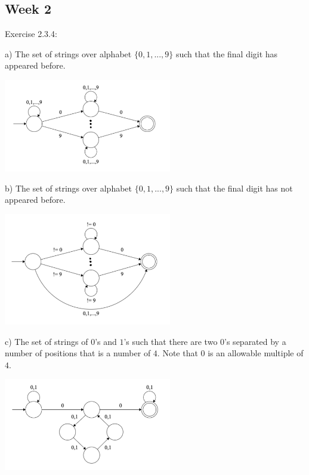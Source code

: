 \documentclass{article}
\theoremstyle{theorem}
\theoremstyle{definition}
\theoremstyle{remark}
\begin{document}
\subsection{Week 2}

\noindent
Exercise 2.3.4:

\medskip\noindent
a) The set of strings over alphabet $\{0,1,..., 9\}$ such that the final digit has appeared before.

\bigskip
\begin{center}
\includegraphics[width=0.55\textwidth]{Images/2.3.4a.png}
\end{center}

\medskip\noindent
b) The set of strings over alphabet $\{0,1,...,9\}$ such that the final digit has not appeared before.

\medskip
\begin{center}
\includegraphics[width=0.55\textwidth]{Images/2.3.4b.png}
\end{center}

\medskip\noindent
c) The set of strings of $0$'s and $1$'s such that there are two $0$'s separated by a number of positions that is a number of $4$. Note that $0$ is an allowable multiple of $4$.

\medskip
\begin{center}
\includegraphics[width=0.55\textwidth]{Images/2.3.4c.png}
\end{center}
\end{document}
